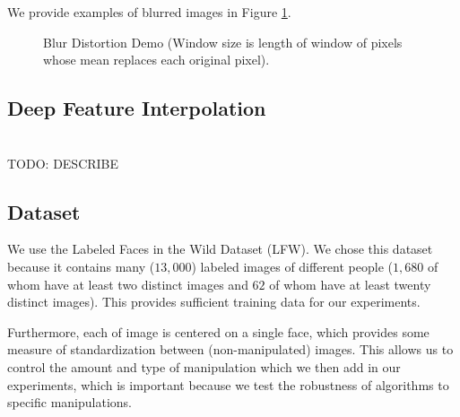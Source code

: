 \documentclass[pageno]{cos429}
\begin{document}
We provide examples of blurred images in Figure \ref{fig:manipulationdemo_blur}.
\begin{figure}[!htb]
\caption{Blur Distortion Demo (Window size is length of window of pixels whose mean replaces each original pixel).}
\label{fig:manipulationdemo_blur}
\end{figure}

\subsection{Deep Feature Interpolation}\hspace*{\fill} \\
TODO: DESCRIBE

\subsection{Dataset}
We use the Labeled Faces in the Wild Dataset (LFW)\cite{huang_labeled_2007}. We chose this dataset because it contains many ($13,000$) labeled images of different people ($1,680$ of whom have at least two distinct images and $62$ of whom have at least twenty distinct images). This provides sufficient training data for our experiments.

Furthermore, each of image is centered on a single face, which provides some measure of standardization between (non-manipulated) images. This allows us to control the amount and type of manipulation which we then add in our experiments, which is important because we test the robustness of algorithms to specific manipulations.
\end{document}
